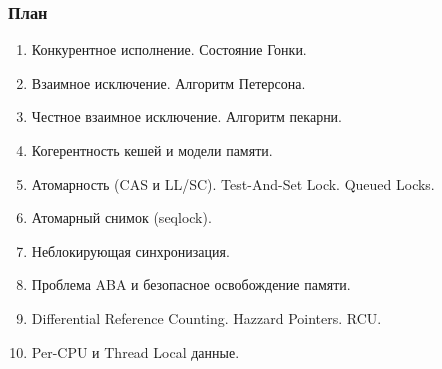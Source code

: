 \begin{frame}
\frametitle{План}

\begin{enumerate}
  \item Конкурентное исполнение. Состояние Гонки.
  \item Взаимное исключение. Алгоритм Петерсона.
  \item Честное взаимное исключение. Алгоритм пекарни.
  \item Когерентность кешей и модели памяти.
  \item Атомарность (CAS и LL/SC). Test-And-Set Lock. Queued Locks.
  \item Атомарный снимок (seqlock).
  \item Неблокирующая синхронизация.
  \item Проблема ABA и безопасное освобождение памяти.
  \item Differential Reference Counting. Hazzard Pointers. RCU.
  \item Per-CPU и Thread Local данные.
\end{enumerate}
\end{frame}
